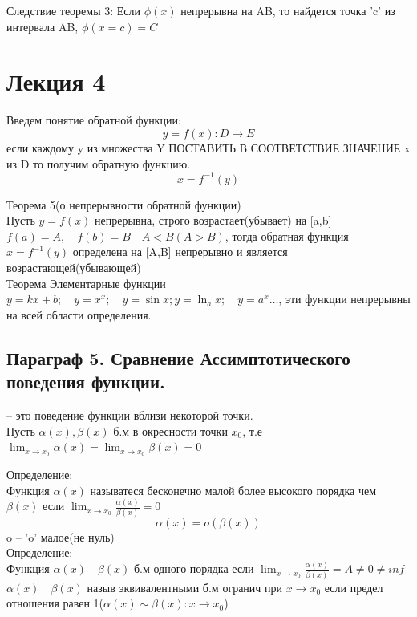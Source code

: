 \documentclass[a4paper, 12pt]{article}
\begin{document}
Следствие теоремы 3: Если $ \phi(x)  $ непрерывна на AB, то найдется точка 'c' из интервала AB, $ \phi(x=c) = C $\\
\section*{Лекция 4}
Введем понятие обратной функции:
\[
  y = f(x): D \to E
\]
если каждому y из множества Y ПОСТАВИТЬ В СООТВЕТСТВИЕ ЗНАЧЕНИЕ x из D то получим обратную функцию.
\[
  x = f^{-1}(y)
\]

\newpage
\begin{mdframed}[backgroundcolor=blue!20] 
       Теорема 5(о непрерывности обратной функции)\\
       Пусть $ y = f(x) $ непрерывна, строго возрастает(убывает) на [a,b] $ f(a) = A,\quad f(b)=B \quad  A<B(A>B)$, тогда обратная функция $ x = f^{-1}(y) $ определена на [A,B] непрерывно и является возрастающей(убывающей)\\

       Теорема Элементарные функции\\
       $ y = kx +b;\quad y = x^x; \quad y = \sin x;y = \ln_a x;\quad  y=a^x \ldots $, эти функции непрерывны на всей области определения.   
    \end{mdframed}
    
\subsection{Параграф 5. Сравнение Ассимптотического поведения функции.}
-- это поведение функции вблизи некоторой точки.\\

Пусть $ \alpha (x), \beta (x) $ б.м в окресности точки $ x_0 $, т.е $ \lim_{x\to x_0} \alpha (x)  = \lim_{x\to x_0} \beta (x) = 0$   

Определение:\\
Функция $ \alpha (x) $ называтеся бесконечно малой более высокого порядка чем $ \beta (x) $ если $ \lim_{x\to x_0} \frac{\alpha (x)}{\beta (x)} = 0  $\\
\[
   \alpha (x) = o(\beta (x))
 \] 
o -- 'o' малое(не нуль)\\

Определение:\\
Функция $ \alpha (x) \quad  \beta (x) $ б.м одного порядка если $ \lim_{x\to x_0} \frac{\alpha (x)}{\beta (x)} = A \neq 0 \neq inf $\\
$ \alpha (x)\quad \beta (x) $ назыв эквивалентными б.м огранич при $ x \to x_0 $ если предел отношения равен 1($ \alpha (x) \sim \beta (x): x\to x_0 $) \\
\end{document}
